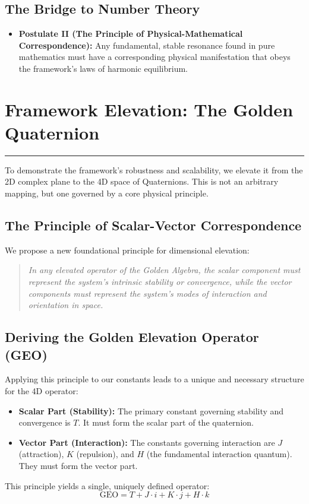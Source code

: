 \subsection*{The Bridge to Number Theory}
\begin{itemize}
    \item \textbf{Postulate II (The Principle of Physical-Mathematical Correspondence):} Any fundamental, stable resonance found in pure mathematics must have a corresponding physical manifestation that obeys the framework's laws of harmonic equilibrium.
\end{itemize}


\section{Framework Elevation: The Golden Quaternion}
\label{chap:quaternion_elevation}

\hrule
\vspace{1em}
To demonstrate the framework's robustness and scalability, we elevate it from the 2D complex plane to the 4D space of Quaternions. This is not an arbitrary mapping, but one governed by a core physical principle.

\subsection*{The Principle of Scalar-Vector Correspondence}
We propose a new foundational principle for dimensional elevation:
\begin{quote}
    \textit{In any elevated operator of the Golden Algebra, the scalar component must represent the system's intrinsic stability or convergence, while the vector components must represent the system's modes of interaction and orientation in space.}
\end{quote}

\subsection*{Deriving the Golden Elevation Operator (GEO)}
Applying this principle to our constants leads to a unique and necessary structure for the 4D operator:
\begin{itemize}
    \item \textbf{Scalar Part (Stability):} The primary constant governing stability and convergence is $T$. It must form the scalar part of the quaternion.
    \item \textbf{Vector Part (Interaction):} The constants governing interaction are $J$ (attraction), $K$ (repulsion), and $H$ (the fundamental interaction quantum). They must form the vector part.
\end{itemize}
This principle yields a single, uniquely defined operator:
$$ \text{GEO} = T + J\cdot i + K\cdot j + H\cdot k $$

